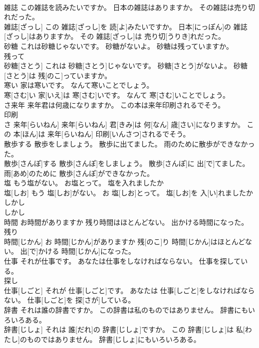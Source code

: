 \documentclass[8pt]{extreport}
\begin{document}
\begin{CJK}{UTF8}{min}
\\	雑誌 この雑誌を読みたいですか。 日本の雑誌はありますか。 その雑誌は売り切れだった。	
\\	雑誌[ざっし] この 雑誌[ざっし]を 読[よ]みたいですか。 日本[にっぽん]の 雑誌[ざっし]はありますか。 その 雑誌[ざっし]は 売り切[うりき]れだった。
\\	砂糖 これは砂糖じゃないです。 砂糖がないよ。 砂糖は残っていますか。	
\\	残って 
\\	砂糖[さとう] これは 砂糖[さとう]じゃないです。 砂糖[さとう]がないよ。 砂糖[さとう]は 残[のこ]っていますか。
\\	寒い 家は寒いです。 なんて寒いことでしょう。	
\\	寒[さむ]い 家[いえ]は 寒[さむ]いです。 なんて 寒[さむ]いことでしょう。
\\	さ来年 来年君は何歳になりますか。 この本は来年印刷されるでそう。	
\\	印刷 
\\	さ 来年[らいねん] 来年[らいねん] 君[きみ]は 何[なん] 歳[さい]になりますか。 この 本[ほん]は 来年[らいねん] 印刷[いんさつ]されるでそう。
\\	散歩する 散歩をしましょう。 散歩に出てました。 雨のために散歩ができなかった。	
\\	散歩[さんぽ]する 散歩[さんぽ]をしましょう。 散歩[さんぽ]に 出[で]てました。 雨[あめ]のために 散歩[さんぽ]ができなかった。
\\	塩 もう塩がない。 お塩とって。 塩を入れましたか	
\\	塩[しお] もう 塩[しお]がない。 お 塩[しお]とって。 塩[しお]を 入[い]れましたか
\\	しかし	
\\	しかし
\\	時間 お時間がありますか 残り時間はほとんどない。 出かける時間になった。	
\\	残り 
\\	時間[じかん] お 時間[じかん]がありますか 残[のこ]り 時間[じかん]はほとんどない。 出[で]かける 時間[じかん]になった。
\\	仕事 それが仕事です。 あなたは仕事をしなければならない。 仕事を探している。	
\\	探し 
\\	仕事[しごと] それが 仕事[しごと]です。 あなたは 仕事[しごと]をしなければならない。 仕事[しごと]を 探[さが]している。
\\	辞書 それは誰の辞書ですか。 この辞書は私のものではありません。 辞書にもいろいろある。	
\\	辞書[じしょ] それは 誰[だれ]の 辞書[じしょ]ですか。 この 辞書[じしょ]は 私[わたし]のものではありません。 辞書[じしょ]にもいろいろある。

\end{CJK}
\end{document}
